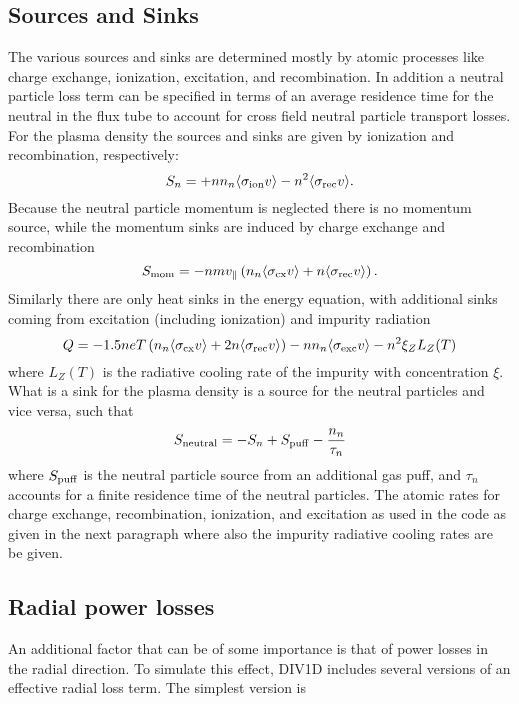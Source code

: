 \documentclass[amsmath,amssymb,a4]{revtex4-2}
\begin{document}
\subsection{Sources and Sinks}

The various sources and sinks are determined mostly by atomic processes like charge exchange, ionization, excitation, and recombination. In addition a neutral particle loss term can be specified in terms of an average residence time for the neutral in the flux tube to account for cross field neutral particle transport losses. For the plasma density the sources and sinks are given by ionization and recombination, respectively:
\begin{equation}\label{particle_source}
    S_n = + n n_n \langle\sigma_{\rm ion} v\rangle - n^2 \langle\sigma_{\rm rec} v\rangle.
\end{equation}
Because the neutral particle momentum is neglected there is no momentum source, while the momentum sinks are induced by charge exchange and recombination
\begin{equation}\label{momentum_source}
    S_{\rm mom} = - n m v_\parallel \left(n_n \langle\sigma_{\rm cx} v\rangle + n \langle\sigma_{\rm rec} v\rangle \right).
\end{equation}
Similarly there are only heat sinks in the energy equation, with additional sinks coming from excitation (including ionization) and impurity radiation
\begin{equation}\label{energy_source}
    Q = - 1.5 n e T \left(n_n \langle\sigma_{\rm cx} v\rangle + 2 n \langle\sigma_{\rm rec} v\rangle \right) - n n_n \langle\sigma_{\rm exc} v\rangle - n^2 \xi_Z L_Z(T)
\end{equation}
where $L_Z(T)$ is the radiative cooling rate of the impurity with concentration $\xi$. What is a sink for the plasma density is a source for the neutral particles and vice versa, such that
\begin{equation}\label{neutral_source}
    S_{\rm neutral} = - S_n + S_{\rm puff} - {n_n \over \tau_n}
\end{equation}
where $S_{\rm puff}$ is the neutral particle source from an additional gas puff, and $\tau_n$ accounts for a finite residence time of the neutral particles. The atomic rates for charge exchange, recombination, ionization, and excitation as used in the code as given in the next paragraph where also the impurity radiative cooling rates are be given.


\subsection{Radial power losses}
An additional factor that can be of some importance is that of power losses in the radial direction. To simulate this effect, DIV1D includes several versions of an effective radial loss term. The simplest version is
\end{document}
